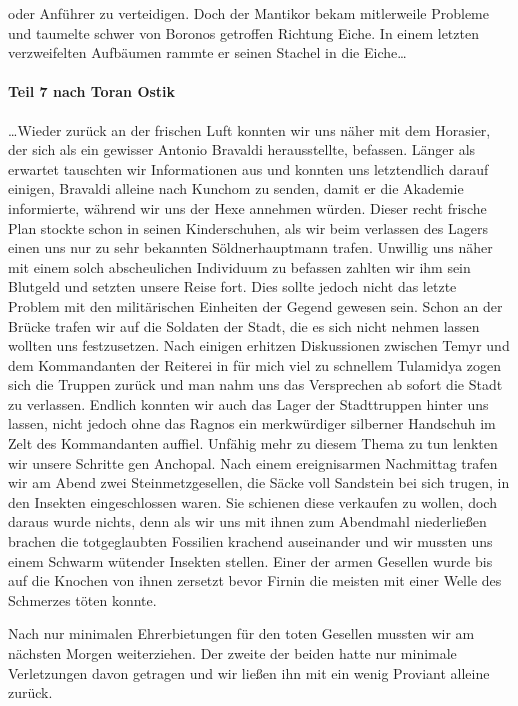 oder Anführer zu verteidigen. Doch der Mantikor bekam mitlerweile Probleme und taumelte schwer von Boronos getroffen Richtung Eiche. In einem letzten verzweifelten Aufbäumen rammte er seinen Stachel in die Eiche\dots
% 

\paragraph{Teil 7 nach Toran Ostik}

\dots Wieder zurück an der frischen Luft konnten wir uns näher mit dem Horasier, der sich als ein gewisser Antonio Bravaldi herausstellte, befassen. Länger als erwartet tauschten wir Informationen aus und konnten uns letztendlich darauf einigen, Bravaldi alleine nach Kunchom zu senden, damit er die Akademie informierte, während wir uns der Hexe annehmen würden. Dieser recht frische Plan stockte schon in seinen Kinderschuhen, als wir beim verlassen des Lagers einen uns nur zu sehr bekannten Söldnerhauptmann trafen. Unwillig uns näher mit einem solch abscheulichen Individuum zu befassen zahlten wir ihm sein Blutgeld und setzten unsere Reise fort. Dies sollte jedoch nicht das letzte Problem mit den militärischen Einheiten der Gegend gewesen sein. Schon an der Brücke trafen wir auf die Soldaten der Stadt, die es sich nicht nehmen lassen wollten uns festzusetzen. Nach einigen erhitzen Diskussionen zwischen Temyr und dem Kommandanten der Reiterei in für mich viel zu schnellem Tulamidya zogen sich die Truppen zurück und man nahm uns das Versprechen ab sofort die Stadt zu verlassen. Endlich konnten wir auch das Lager der Stadttruppen hinter uns lassen, nicht jedoch ohne das Ragnos ein merkwürdiger silberner Handschuh im Zelt des Kommandanten auffiel. Unfähig mehr zu diesem Thema zu tun lenkten wir unsere Schritte gen Anchopal. Nach einem ereignisarmen Nachmittag trafen wir am Abend zwei Steinmetzgesellen, die Säcke voll Sandstein bei sich trugen, in den Insekten eingeschlossen waren. Sie schienen diese verkaufen zu wollen, doch daraus wurde nichts, denn als wir uns mit ihnen zum Abendmahl niederließen brachen die totgeglaubten Fossilien krachend auseinander und wir mussten uns einem Schwarm wütender Insekten stellen. Einer der armen Gesellen wurde bis auf die Knochen von ihnen zersetzt bevor Firnin die meisten mit einer Welle des Schmerzes töten konnte.

Nach nur minimalen Ehrerbietungen für den toten Gesellen mussten wir am nächsten Morgen weiterziehen. Der zweite der beiden hatte nur minimale Verletzungen davon getragen und wir ließen ihn mit ein wenig Proviant alleine zurück.


